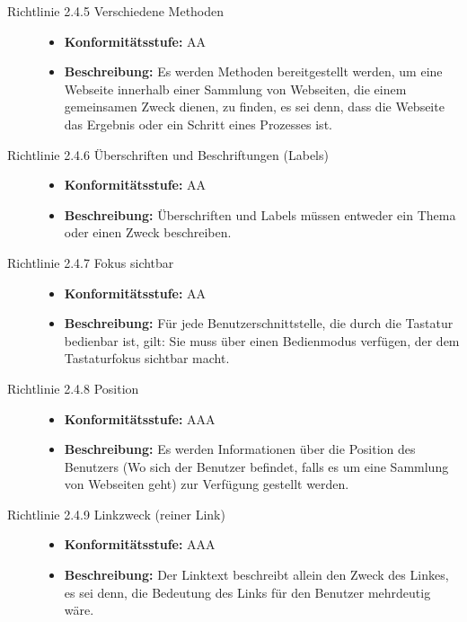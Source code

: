 \begin{description}
\begin{description}
		\item[Richtlinie 2.4.5 Verschiedene Methoden]\hfill
		\begin{itemize}
			\item \textbf{Konformitätsstufe:} AA
			\item \textbf{Beschreibung:} Es werden Methoden bereitgestellt werden, um eine Webseite innerhalb einer Sammlung von Webseiten, die einem 
			gemeinsamen Zweck dienen, zu finden, es sei denn, dass die Webseite das Ergebnis oder ein Schritt eines Prozesses ist.
		\end{itemize}
		
		\item[Richtlinie 2.4.6 Überschriften und Beschriftungen (Labels)]\hfill
		\begin{itemize}
			\item \textbf{Konformitätsstufe:} AA
			\item \textbf{Beschreibung:} Überschriften und Labels müssen entweder ein Thema oder einen Zweck beschreiben.
		\end{itemize}
		
		\item[Richtlinie 2.4.7 Fokus sichtbar]\hfill
		\begin{itemize}
			\item \textbf{Konformitätsstufe:} AA
			\item \textbf{Beschreibung:} Für jede Benutzerschnittstelle, die durch die Tastatur bedienbar ist, gilt: Sie muss über einen Bedienmodus
			verfügen, der dem Tastaturfokus sichtbar macht.
		\end{itemize}
		
		\item[Richtlinie 2.4.8 Position]\hfill
		\begin{itemize}
			\item \textbf{Konformitätsstufe:} AAA
			\item \textbf{Beschreibung:} Es werden Informationen über die Position des Benutzers (Wo sich der Benutzer befindet, falls es um eine 
			Sammlung von Webseiten geht) zur Verfügung gestellt werden.
		\end{itemize}
		
		\item[Richtlinie 2.4.9 Linkzweck (reiner Link)]\hfill
		\begin{itemize}
			\item \textbf{Konformitätsstufe:} AAA
			\item \textbf{Beschreibung:} Der Linktext beschreibt allein den Zweck des Linkes, es sei denn, die Bedeutung des Links für den Benutzer 
			mehrdeutig wäre.
		\end{itemize}
		

\end{description}
\end{description}
